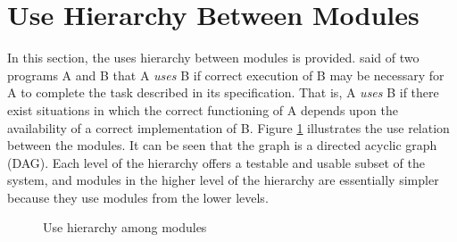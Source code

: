 \documentclass[12pt, titlepage]{article}
\begin{document}
\section{Use Hierarchy Between Modules} \label{SecUse}

In this section, the uses hierarchy between modules is
provided. \citet{Parnas1978} said of two programs A and B that A {\em uses} B if
correct execution of B may be necessary for A to complete the task described in
its specification. That is, A {\em uses} B if there exist situations in which
the correct functioning of A depends upon the availability of a correct
implementation of B.  Figure \ref{FigUH} illustrates the use relation between
the modules. It can be seen that the graph is a directed acyclic graph
(DAG). Each level of the hierarchy offers a testable and usable subset of the
system, and modules in the higher level of the hierarchy are essentially simpler
because they use modules from the lower levels.



\begin{figure}[H]
\centering
\caption{Use hierarchy among modules}
\label{FigUH}
\end{figure}

\end{document}
